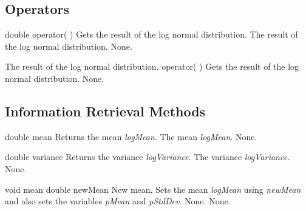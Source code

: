 \clearpage

\subsection{Operators}

\setNormalInstance
\printEmptyMethodReturnSpecial
{double}
{operator( )}
{Gets the result of the log normal distribution.}
{The result of the log normal distribution.}
{None.}

\setNormalInstance
\setCorrectWidthThree{8pt}
\printMethodWithParamsSaved
{}
{The result of the log normal distribution.}
{operator( )}
{Gets the result of the log normal distribution.}
{None.}
\setCorrectWidthThree{4pt}

\vspace*{10mm}

\subsection{Information Retrieval Methods}

\setConstInstance
\printEmptyMethodReturnSpecial
{double}
{mean}
{Returns the mean {\em logMean}.}
{The mean {\em logMean}.}
{None.}

\setConstInstance
\printEmptyMethodReturnSpecial
{double}
{variance}
{Returns the variance {\em logVariance}.}
{The variance {\em logVariance}.}
{None.}

\clearpage

\setNormalInstance
\printMethodWithOneParam
{void}
{mean}
{double}
{newMean}
{New mean.}
{Sets the mean {\em logMean} using {\em newMean} and also sets the variables
{\em pMean} and {\em pStdDev}.}
{None.}
{None.}

